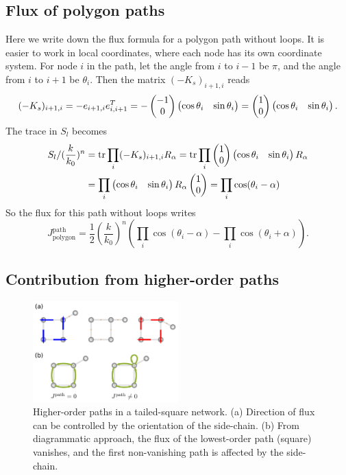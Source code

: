 \documentclass[
 amsmath,amssymb,
 aps,
 pre,
 longbibliography,
 10pt, onecolumn,
 notitlepage
]{revtex4-1}
\begin{document}
\subsection{Flux of polygon paths}
Here we write down the flux formula for a polygon path without loops.
It is easier to work in local coordinates, where each node has its own coordinate system.
For node $i$ in the path, let the angle from $i$ to $i-1$ be $\pi$, and the angle from $i$ to $i+1$ be $\theta_i$.
Then the matrix $(-K_s)_{i+1,i}$ reads
\begin{equation}
    (-K_s)_{i+1,i}
    = -e_{i+1,i} e_{i,i+1}^T
    = -\pmqty{-1 \\ 0} \pmqty{\cos\theta_i & \sin\theta_i}
    = \pmqty{1 \\ 0} \pmqty{\cos\theta_i & \sin\theta_i}.
\end{equation}
The trace in $S_l$ becomes
\begin{equation}
    \begin{split}
    S_l / (\frac{k}{k_0})^n
    &= \tr \prod_i (-K_s)_{i+1,i} R_\alpha
    = \tr \prod_i \pmqty{1 \\ 0} \pmqty{\cos\theta_i & \sin\theta_i} R_\alpha \\
    &= \prod_i \pmqty{\cos\theta_i & \sin\theta_i} R_\alpha \pmqty{1 \\ 0}
    = \prod_i \cos(\theta_i - \alpha)
    \end{split}
\end{equation}
So the flux for this path without loops writes
\begin{equation} \label{eqnS:smallk_path_polygon}
    J^\text{path}_\text{polygon} = \frac{1}{2} (\frac{k}{k_0})^n (\prod_i \cos(\theta_i - \alpha) - \prod_i \cos(\theta_i + \alpha)).
\end{equation}

\subsection{Contribution from higher-order paths}
\begin{figure}[ht]
	\centering
	\includegraphics[width=0.5\textwidth]{path_square_tail.pdf}
    \caption{
        Higher-order paths in a tailed-square network.
        (a) Direction of flux can be controlled by the orientation of the side-chain.
        (b) From diagrammatic approach, the flux of the lowest-order path (square) vanishes, and the first non-vanishing path is affected by the side-chain.
    }
    \label{fig:path_square_tail}
\end{figure}
\end{document}
